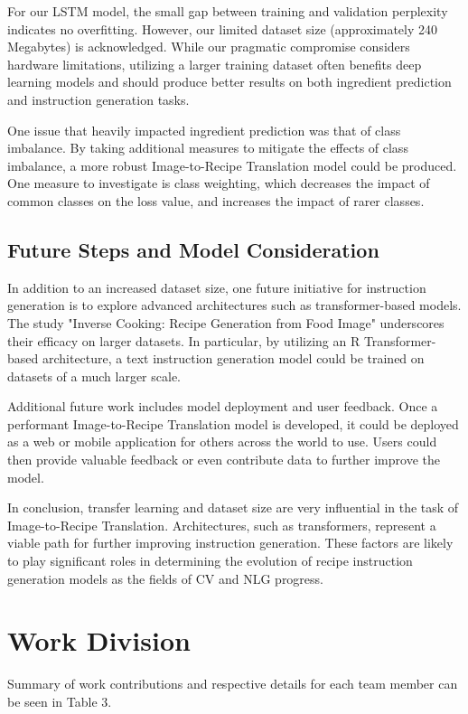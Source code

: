 \documentclass[10pt,twocolumn,letterpaper]{article}
\begin{document}
For our LSTM model, the small gap between training and validation perplexity indicates no overfitting. However, our limited dataset size (approximately 240 Megabytes) is acknowledged. While our pragmatic compromise considers hardware limitations, utilizing a larger training dataset often benefits deep learning models and should produce better results on both ingredient prediction and instruction generation tasks.

One issue that heavily impacted ingredient prediction was that of class imbalance. By taking additional measures to mitigate the effects of class imbalance, a more robust Image-to-Recipe Translation model could be produced. One measure to investigate is class weighting, which decreases the impact of common classes on the loss value, and increases the impact of rarer classes.

\subsection{Future Steps and Model Consideration}

In addition to an increased dataset size, one future initiative for instruction generation is to explore advanced architectures such as transformer-based models. The study "Inverse Cooking: Recipe Generation from Food Image" \cite{Salvador_Drozdzal_Giro-i-Nieto_Romero_2019_orig_2} underscores their efficacy on larger datasets. In particular, by utilizing an R Transformer-based architecture, a text instruction generation model could be trained on datasets of a much larger scale.

Additional future work includes model deployment and user feedback. Once a performant Image-to-Recipe Translation model is developed, it could be deployed as a web or mobile application for others across the world to use. Users could then provide valuable feedback or even contribute data to further improve the model.

In conclusion, transfer learning and dataset size are very influential in the task of Image-to-Recipe Translation. Architectures, such as transformers, represent a viable path for further improving instruction generation. These factors are likely to play significant roles in determining the evolution of recipe instruction generation models as the fields of CV and NLG progress.

\section{Work Division}
Summary of work contributions and respective details for each team member can be seen in Table 3.
\end{document}
